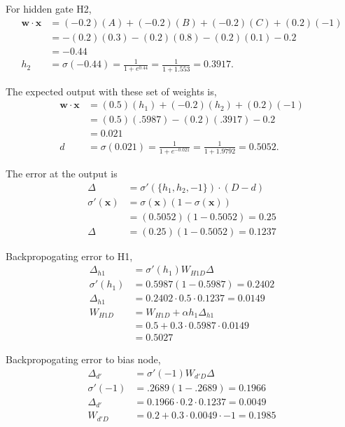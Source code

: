 \documentclass[11pt]{article}
\newcommand{\vc}[1]{\mathbf{#1}}
\newcommand{\dotp}[2]{\vc{#1} \cdot \vc{#2}}
\begin{document}
For hidden gate H2,
\begin{align*}
	\dotp{w}{x} &= (-0.2)(A) + (-0.2)(B) + (-0.2)(C) + (0.2)(-1) \\
		&= - (0.2)(0.3) - (0.2)(0.8) - (0.2)(0.1) - 0.2 \\
		&= - 0.44 \\
	h_2 &= \sigma(-0.44) = \frac{1}{1 + e^{0.44}} = \frac{1}{1 + 1.553} = 0.3917.
\end{align*}
	
The expected output with these set of weights is,
\begin{align*}
	\dotp{w}{x} &= (0.5)(h_1) + (-0.2)(h_2) + (0.2)(-1) \\
		&= (0.5)(.5987) - (0.2)(.3917) - 0.2 \\
		&= 0.021 \\
	d &= \sigma(0.021) = \frac{1}{1 + e^{-0.021}} = \frac{1}{1 + 1.9792} = 0.5052.
\end{align*}

The error at the output is
\begin{align*}
	\Delta &= \sigma'(\{h_1,h_2,-1\}) \cdot (D - d) \\
	\sigma'(\vc{x}) &= \sigma(\vc{x})(1 - \sigma(\vc{x})) \\
		&= (0.5052)(1 - 0.5052) = 0.25 \\
	\Delta &= (0.25)(1 - 0.5052) = 0.1237
\end{align*}

Backpropogating error to H1,
\begin{align*}
	\Delta_{h1}  &= \sigma'(h_1) W_{H1D} \Delta \\
	\sigma'(h_1) &= 0.5987 ( 1 - 0.5987) = 0.2402 \\
	\Delta_{h1}  &= 0.2402 \cdot 0.5 \cdot 0.1237 = 0.0149 \\
	W_{H1D} &= W_{H1D} + \alpha h_1 \Delta_{h1} \\
		&= 0.5 + 0.3 \cdot 0.5987 \cdot 0.0149 \\
		&= 0.5027
\end{align*}

Backpropogating error to bias node,
\begin{align*}
	\Delta_{d'}  &= \sigma'(-1) W_{d'D} \Delta \\
	\sigma'(-1)  &= .2689 ( 1 - .2689 ) = 0.1966 \\
	\Delta_{d'}  &= 0.1966 \cdot 0.2 \cdot 0.1237 = 0.0049 \\
	W_{d'D} 		 &= 0.2 + 0.3 \cdot 0.0049 \cdot -1 = 0.1985
\end{align*}
\end{document}
